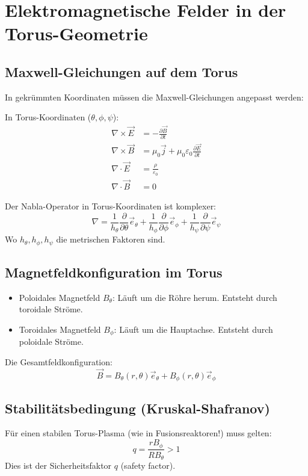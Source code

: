 	\section{Elektromagnetische Felder in der Torus-Geometrie}
	\subsection{Maxwell-Gleichungen auf dem Torus}
	In gekrümmten Koordinaten müssen die Maxwell-Gleichungen angepasst werden:
	
	In Torus-Koordinaten (\( \theta, \phi, \psi \)):
	\begin{align}
		\nabla \times \vec{E} &= -\frac{\partial \vec{B}}{\partial t} \\
		\nabla \times \vec{B} &= \mu_0 \vec{j} + \mu_0 \varepsilon_0 \frac{\partial \vec{E}}{\partial t} \\
		\nabla \cdot \vec{E} &= \frac{\rho}{\varepsilon_0} \\
		\nabla \cdot \vec{B} &= 0
	\end{align}
	
	Der Nabla-Operator in Torus-Koordinaten ist komplexer:
	\[
	\nabla = \frac{1}{h_\theta} \frac{\partial}{\partial \theta} \vec{e}_\theta + \frac{1}{h_\phi} \frac{\partial}{\partial \phi} \vec{e}_\phi + \frac{1}{h_\psi} \frac{\partial}{\partial \psi} \vec{e}_\psi
	\]
	Wo \( h_\theta, h_\phi, h_\psi \) die metrischen Faktoren sind.
	
	\subsection{Magnetfeldkonfiguration im Torus}
	\begin{itemize}
		\item Poloidales Magnetfeld \( B_\theta \):
		Läuft um die Röhre herum. Entsteht durch toroidale Ströme.
		\item Toroidales Magnetfeld \( B_\phi \):
		Läuft um die Hauptachse. Entsteht durch poloidale Ströme.
	\end{itemize}
	
	Die Gesamtfeldkonfiguration:
	\[
	\vec{B} = B_\theta(r, \theta) \vec{e}_\theta + B_\phi(r, \theta) \vec{e}_\phi
	\]
	
	\subsection{Stabilitätsbedingung (Kruskal-Shafranov)}
	Für einen stabilen Torus-Plasma (wie in Fusionsreaktoren!) muss gelten:
	\[
	q = \frac{r B_\phi}{R B_\theta} > 1
	\]
	Dies ist der Sicherheitsfaktor \( q \) (safety factor).
	
